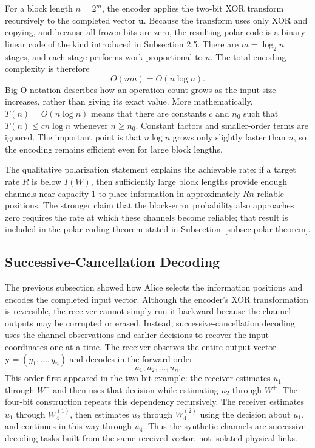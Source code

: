 For a block length $n=2^m$, the encoder applies the two-bit XOR transform recursively to the completed vector $\mathbf{u}$. Because the transform uses only XOR and copying, and because all frozen bits are zero, the resulting polar code is a binary linear code of the kind introduced in Subsection 2.5. There are $m=\log_2n$ stages, and each stage performs work proportional to $n$. The total encoding complexity is therefore
\begin{equation}
O(nm)=O(n\log n).
\label{eq:polar-encoding-complexity}
\end{equation}
Big-O notation describes how an operation count grows as the input size increases, rather than giving its exact value. More mathematically, $T(n)=O(n\log n)$ means that there are constants $c$ and $n_0$ such that $T(n)\leq c n\log n$ whenever $n\geq n_0$. Constant factors and smaller-order terms are ignored. The important point is that $n\log n$ grows only slightly faster than $n$, so the encoding remains efficient even for large block lengths.

The qualitative polarization statement explains the achievable rate: if a target rate $R$ is below $I(W)$, then sufficiently large block lengths provide enough channels near capacity $1$ to place information in approximately $Rn$ reliable positions. The stronger claim that the block-error probability also approaches zero requires the rate at which these channels become reliable; that result is included in the polar-coding theorem stated in Subsection~\ref{subsec:polar-theorem}.

\subsection{Successive-Cancellation Decoding}

The previous subsection showed how Alice selects the information positions and encodes the completed input vector. Although the encoder's XOR transformation is reversible, the receiver cannot simply run it backward because the channel outputs may be corrupted or erased. Instead, successive-cancellation decoding uses the channel observations and earlier decisions to recover the input coordinates one at a time. The receiver observes the entire output vector $\mathbf{y}=(y_1,\ldots,y_n)$ and decodes in the forward order
\begin{equation}
u_1,u_2,\ldots,u_n.
\label{eq:successive-cancellation-order}
\end{equation}
This order first appeared in the two-bit example: the receiver estimates $u_1$ through $W^-$ and then uses that decision while estimating $u_2$ through $W^+$. The four-bit construction repeats this dependency recursively. The receiver estimates $u_1$ through $W_4^{(1)}$, then estimates $u_2$ through $W_4^{(2)}$ using the decision about $u_1$, and continues in this way through $u_4$. Thus the synthetic channels are successive decoding tasks built from the same received vector, not isolated physical links.

